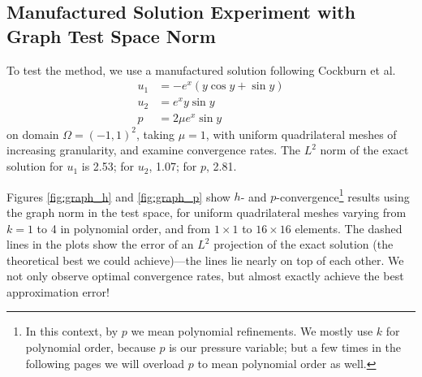 \subsection{Manufactured Solution Experiment with Graph Test Space Norm}
To test the method, we use a manufactured solution following Cockburn et al. \cite{CockburnKanschatSchotzauSchwab03}
\begin{align*}
u_{1} &=  -e^{x} ( y \cos y + \sin y )\\
u_{2} &=  e^{x}  y \sin y\\
p &= 2 \mu e^{x} \sin y
\end{align*}
on domain $\Omega = (-1,1)^2$, taking $\mu=1$, with uniform quadrilateral meshes of increasing granularity, and examine convergence rates.  The $L^{2}$ norm of the exact solution for $u_{1}$ is 2.53; for $u_{2}$, 1.07; for $p$, 2.81.

Figures \ref{fig:graph_h} and \ref{fig:graph_p} show $h$- and $p$-convergence\footnote{In this context, by $p$ we mean polynomial refinements.  We mostly use $k$ for polynomial order, because $p$ is our pressure variable; but a few times in the following pages we will overload $p$ to mean polynomial order as well.} results using the graph norm in the test space, for uniform quadrilateral meshes varying from $k=1$ to 4 in polynomial order, and from $1 \times 1$ to $16 \times 16$ elements.  The dashed lines in the plots show the error of an $L^{2}$ projection of the exact solution (the theoretical best we could achieve)---the lines lie nearly on top of each other.  We not only observe optimal convergence rates, but almost exactly achieve the best approximation error!

